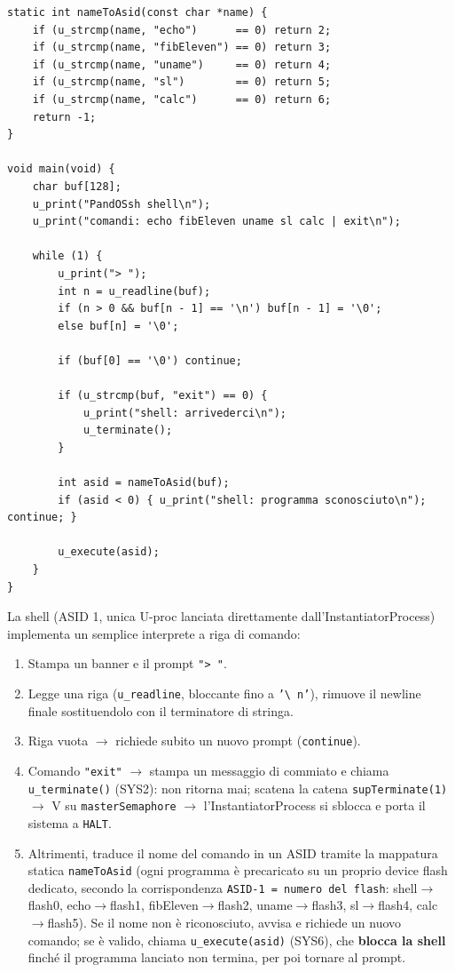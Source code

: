 \documentclass[11pt,a4paper]{article}
\newcommand{\code}[1]{\texttt{#1}}
\begin{document}
\begin{lstlisting}
static int nameToAsid(const char *name) {
    if (u_strcmp(name, "echo")      == 0) return 2;
    if (u_strcmp(name, "fibEleven") == 0) return 3;
    if (u_strcmp(name, "uname")     == 0) return 4;
    if (u_strcmp(name, "sl")        == 0) return 5;
    if (u_strcmp(name, "calc")      == 0) return 6;
    return -1;
}

void main(void) {
    char buf[128];
    u_print("PandOSsh shell\n");
    u_print("comandi: echo fibEleven uname sl calc | exit\n");

    while (1) {
        u_print("> ");
        int n = u_readline(buf);
        if (n > 0 && buf[n - 1] == '\n') buf[n - 1] = '\0';
        else buf[n] = '\0';

        if (buf[0] == '\0') continue;

        if (u_strcmp(buf, "exit") == 0) {
            u_print("shell: arrivederci\n");
            u_terminate();
        }

        int asid = nameToAsid(buf);
        if (asid < 0) { u_print("shell: programma sconosciuto\n"); continue; }

        u_execute(asid);
    }
}
\end{lstlisting}
La shell (ASID 1, unica U-proc lanciata direttamente
dall'InstantiatorProcess) implementa un semplice interprete a riga di
comando:
\begin{enumerate}
\item Stampa un banner e il prompt \code{"> "}.
\item Legge una riga (\code{u\_readline}, bloccante fino a \code{'\textbackslash
  n'}), rimuove il newline finale sostituendolo con il terminatore di
  stringa.
\item Riga vuota $\to$ richiede subito un nuovo prompt (\code{continue}).
\item Comando \code{"exit"} $\to$ stampa un messaggio di commiato e chiama
  \code{u\_terminate()} (SYS2): non ritorna mai; scatena la catena
  \code{supTerminate(1)} $\to$ V su \code{masterSemaphore} $\to$
  l'InstantiatorProcess si sblocca e porta il sistema a \code{HALT}.
\item Altrimenti, traduce il nome del comando in un ASID tramite la
  mappatura statica \code{nameToAsid} (ogni programma è precaricato su un
  proprio device flash dedicato, secondo la corrispondenza \code{ASID-1 =
  numero del flash}: shell$\to$flash0, echo$\to$flash1,
  fibEleven$\to$flash2, uname$\to$flash3, sl$\to$flash4, calc$\to$flash5).
  Se il nome non è riconosciuto, avvisa e richiede un nuovo comando; se è
  valido, chiama \code{u\_execute(asid)} (SYS6), che \textbf{blocca la
  shell} finché il programma lanciato non termina, per poi tornare al
  prompt.
\end{enumerate}
\end{document}

